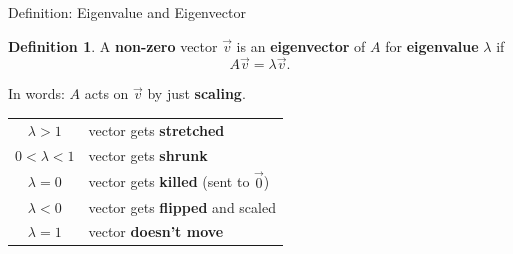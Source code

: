 \documentclass[10pt]{beamer}
\theoremstyle{definition}
\newtheorem{defi}{Definition}[section]
\newcommand{\x}[1]{\alert{\textbf{#1}}}
\begin{document}
\begin{frame}{Definition: Eigenvalue and Eigenvector}

\begin{defi}
A \x{non-zero} vector $\vec{v}$ is an \x{eigenvector} of $A$ for \x{eigenvalue} $\lambda$ if
$$A\vec{v} = \lambda\vec{v}.$$
\end{defi}

\vfill

In words: $A$ acts on $\vec{v}$ by just \x{scaling}.

\vfill

\begin{center}
\renewcommand{\arraystretch}{1.4}
\begin{tabular}{cl}
$\lambda > 1$ & vector gets \x{stretched} \\
$0 < \lambda < 1$ & vector gets \x{shrunk} \\
$\lambda = 0$ & vector gets \x{killed} (sent to $\vec{0}$) \\
$\lambda < 0$ & vector gets \x{flipped} and scaled \\
$\lambda = 1$ & vector \x{doesn't move}
\end{tabular}
\end{center}

\end{frame}
\end{document}
